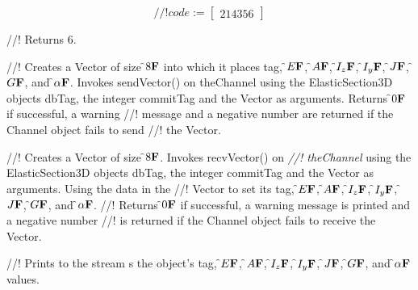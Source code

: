 \begin{equation}
//! code := \left[
   \begin{array}{c}
       2
       1
       4
       3
       5
       6
   \end{array} 
 \right]
\end{equation}

//! Returns 6.

//! Creates a Vector of size \f$8{\bf F}$ into which it places  \p tag,
\f$E{\bf F}$, \f$A{\bf F}$, \f$I_z{\bf F}$, \f$I_y{\bf F}$, \f$J{\bf F}$, \f$G{\bf F}$, and \f$\alpha{\bf F}$. Invokes sendVector() on 
\p theChannel using the ElasticSection3D objects \p dbTag, the integer
\p commitTag and the Vector as arguments. Returns \f$0{\bf F}$ if successful, a warning
//! message and a negative number are returned if the Channel object fails to send
//! the Vector.

//! Creates a Vector of size \f$8{\bf F}$. Invokes recvVector() on  {\em
//! theChannel} using the ElasticSection3D objects \p dbTag, the integer
\p commitTag and the Vector as arguments. Using the data in the
//! Vector to set its \p tag, \f$E{\bf F}$, \f$A{\bf F}$, \f$I_z{\bf F}$, \f$I_y{\bf F}$, \f$J{\bf F}$, \f$G{\bf F}$, and \f$\alpha{\bf F}$.
//! Returns \f$0{\bf F}$ if successful, a warning message is printed and a negative number
//! is returned if the Channel object fails to receive the Vector.

//! Prints to the stream \p s the object's \p tag, \f$E{\bf F}$, \f$A{\bf F}$, \f$I_z{\bf F}$, \f$I_y{\bf F}$, \f$J{\bf F}$, 
\f$G{\bf F}$, and \f$\alpha{\bf F}$ values.



